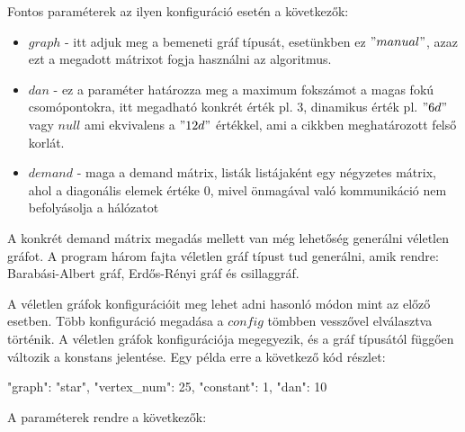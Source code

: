 \documentclass[12pt]{report}
\begin{document}
Fontos paraméterek az ilyen konfiguráció esetén a következők:
\begin{itemize}
	\item $graph$ - itt adjuk meg a bemeneti gráf típusát, esetünkben ez $"manual"$, azaz ezt a megadott mátrixot fogja használni az algoritmus.
	\item $dan$ - ez a paraméter határozza meg a maximum fokszámot a magas fokú csomópontokra, itt megadható konkrét érték pl. 3, dinamikus érték pl. $"6d"$ vagy $null$ ami ekvivalens a $"12d"$ értékkel, ami a cikkben \cite{avin_demand-aware_nodate} meghatározott felső korlát.
	\item $demand$ - maga a demand mátrix, listák listájaként egy négyzetes mátrix, ahol a diagonális elemek értéke $0$, mivel önmagával való kommunikáció nem befolyásolja a hálózatot
\end{itemize}

A konkrét demand mátrix megadás mellett van még lehetőség generálni véletlen gráfot.
A program három fajta véletlen gráf típust tud generálni, amik rendre: Barabási-Albert gráf, Erdős-Rényi gráf és csillaggráf.

A véletlen gráfok konfigurációit meg lehet adni hasonló módon mint az előző esetben.
Több konfiguráció megadása a $config$ tömbben vesszővel elválasztva történik.
A véletlen gráfok konfigurációja megegyezik, és a gráf típusától függően változik a konstans jelentése. 
Egy példa erre a következő kód részlet:

\pagebreak

\begin{mintedJson}
{
	"graph": "star",
	"vertex_num": 25,
	"constant": 1,
	"dan": 10
}
\end{mintedJson}


A paraméterek rendre a következők:
\end{document}
